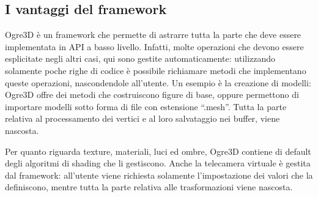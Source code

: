 \subsection{I vantaggi del framework}
Ogre3D è un framework che permette di astrarre tutta la parte che deve essere implementata in API a basso livello. Infatti, molte operazioni che devono essere esplicitate negli altri casi, qui sono gestite automaticamente: utilizzando solamente poche righe di codice è possibile richiamare metodi che implementano queste operazioni, nascondendole all'utente.
Un esempio è la creazione di modelli: Ogre3D offre dei metodi che costruiscono figure di base, oppure permettono di importare modelli sotto forma di file con estensione “.mesh”. Tutta la parte relativa al processamento dei vertici e al loro salvataggio nei buffer, viene nascosta.

Per quanto riguarda texture, materiali, luci ed ombre, Ogre3D contiene di default degli algoritmi di shading che li gestiscono. Anche la telecamera virtuale è gestita dal framework: all'utente viene richiesta solamente l'impostazione dei valori che la definiscono, mentre tutta la parte relativa alle trasformazioni viene nascosta.

